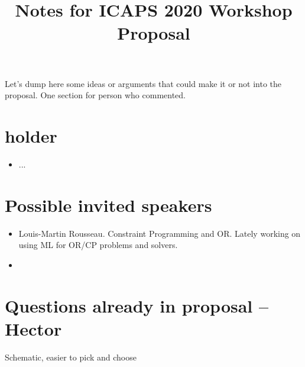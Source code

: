 \documentclass[10pt]{article}
\begin{document}
\title{Notes for ICAPS 2020 Workshop Proposal}
\date{}

\author{}

\maketitle

Let's dump here some ideas or arguments that could make it or not into the proposal.
One section for person who commented.

\section*{holder}

\begin{itemize}
\item ...
\end{itemize}

\section*{Possible invited speakers}

\begin{itemize}
\item Louis-Martin Rousseau. Constraint Programming and OR. Lately working on using ML for OR/CP problems and solvers.
\item 
\end{itemize}

\section*{Questions already in proposal – Hector}

Schematic, easier to pick and choose
\end{document}
